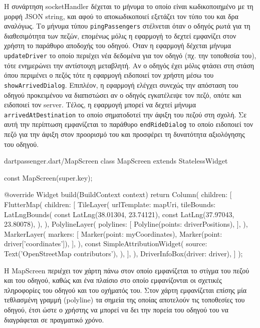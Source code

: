 \documentclass[../thesis.tex]{subfiles}
\begin{document}
Η συνάρτηση socketHandler δέχεται το μήνυμα το οποίο είναι κωδικοποιημένο με τη μορφή JSON string, και αφού το αποκωδικοποιεί εξετάζει τον τύπο του και δρα αναλόγως.
Το μήνυμα τύπου \verb|pingPassengers| στέλνεται όταν ο οδηγός ρωτά για τη διαθεσιμότητα των πεζών, επομένως μόλις η εφαρμογή το δεχτεί εμφανίζει στον χρήστη το παράθυρο αποδοχής του οδηγού.
Όταν η εφαρμογή δέχεται μήνυμα \verb|updateDriver| το οποίο περιέχει νέα δεδομένα για τον οδηγό (πχ. την τοποθεσία του), τότε ενημερώνει την αντίστοιχη μεταβλητή.
Αν ο οδηγός έχει μόλις φτάσει στη στάση όπου περιμένει ο πεζός τότε η εφαρμογή ειδοποιεί τον χρήστη μέσω του \verb|showArrivedDialog|.
Επιπλέον, η εφαρμογή ελέγχει συνεχώς την απόσταση του οδηγού προκειμένου να διαπιστώσει αν ο οδηγός εγκατέλειψε τον πεζό, οπότε και ειδοποιεί τον server.
Τέλος, η εφαρμογή μπορεί να δεχτεί μήνυμα \verb|arrivedAtDestination| το οποίο σηματοδοτεί την άφιξη του πεζού στη σχολή.
Σε αυτή την περίπτωση εμφανίζεται το παράθυρο \verb|endRideDialog| το οποίο ειδοποιεί τον πεζό για την άφιξη στον προορισμό του και προσφέρει τη δυνατότητα αξιολόγησης του οδηγού.


\begin{codeblock}{dart}{passenger.dart/MapScreen}
  class MapScreen extends StatelessWidget {
  const MapScreen({super.key});

  @override
  Widget build(BuildContext context) {
    return Column(
      children: [
        FlutterMap(
          children: [
            TileLayer(
              urlTemplate: mapUri,
              tileBounds: LatLngBounds(
                const LatLng(38.01304, 23.74121),
                const LatLng(37.97043, 23.80078),
              ),
            ),
            PolylineLayer(
              polylines: [
                Polyline(points: driverPositions),
              ],
            ),
            MarkerLayer(
              markers: [
                Marker(point: myCoordinates),
                Marker(point: driver['coordinates']), 
              ],
            ),
            const SimpleAttributionWidget(
              source: Text('OpenStreetMap contributors'),
            ),
          ],
        ),
        DriverInfoBox(driver: driver),
      ]
    );
  }
}
\end{codeblock}

Η MapScreen περιέχει τον χάρτη πάνω στον οποίο εμφανίζεται το στίγμα του πεζού και του οδηγού, καθώς και ένα πλαίσιο στο οποίο εμφανίζονται οι σχετικές πληροφορίες του οδηγού και του οχήματός του.
Στον χάρτη εμφανίζεται επίσης μία τεθλασμένη γραμμή (polyline) τα σημεία της οποίας αποτελούν τις τοποθεσίες του οδηγού, έτσι ώστε ο χρήστης να μπορεί να δει την πορεία του οδηγού του να διαγράφεται σε πραγματικό χρόνο.
\end{document}
